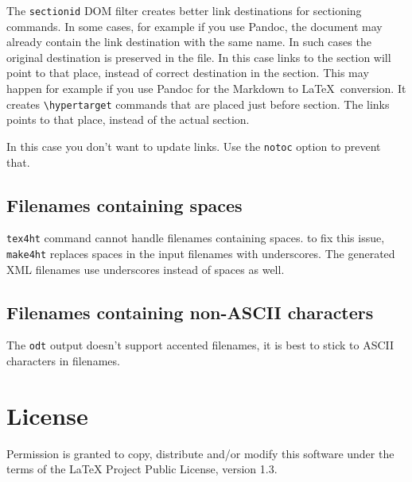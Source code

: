 The \texttt{sectionid} DOM filter creates better link destinations for
sectioning commands. In some cases, for example if you use Pandoc, the
document may already contain the link destination with the same name. In
such cases the original destination is preserved in the file. In this
case links to the section will point to that place, instead of correct
destination in the section. This may happen for example if you use
Pandoc for the Markdown to \LaTeX~conversion. It creates
\texttt{\textbackslash{}hypertarget} commands that are placed just
before section. The links points to that place, instead of the actual
section.

In this case you don't want to update links. Use the \texttt{notoc}
option to prevent that.

\subsection{Filenames containing
spaces}\label{filenames-containing-spaces}

\texttt{tex4ht} command cannot handle filenames containing spaces. to
fix this issue, \texttt{make4ht} replaces spaces in the input filenames
with underscores. The generated XML filenames use underscores instead of
spaces as well.

\subsection{Filenames containing non-ASCII
characters}\label{filenames-containing-non-ascii-characters}

The \texttt{odt} output doesn't support accented filenames, it is best
to stick to ASCII characters in filenames.

\section{License}\label{license}

Permission is granted to copy, distribute and/or modify this software
under the terms of the LaTeX Project Public License, version 1.3.
